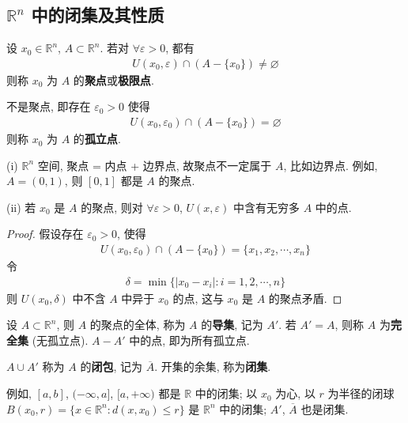 \documentclass[../../main.tex]{subfiles}
\begin{document}
\subsection{$\mathbb{R}^n$ 中的闭集及其性质}

\begin{definition}[聚点、极限点和孤立点]
设 $x_0 \in \mathbb{R}^n$, $A \subset \mathbb{R}^n$. 若对 $\forall \varepsilon > 0$, 都有
\begin{align*}
U(x_0, \varepsilon) \cap (A - \{x_0\}) \neq \varnothing
\end{align*}
则称 $x_0$ 为 $A$ 的\textbf{聚点}或\textbf{极限点}. 

不是聚点, 即存在 $\varepsilon_0 > 0$ 使得
\begin{align*}
U(x_0, \varepsilon_0) \cap (A - \{x_0\}) = \varnothing
\end{align*}
则称 $x_0$ 为 $A$ 的\textbf{孤立点}.
\end{definition}
\begin{remark}
(i) $\mathbb{R}^n$ 空间, 聚点 = 内点 + 边界点, 故聚点不一定属于 $A$, 比如边界点. 例如, $A = (0, 1)$, 则 $[0, 1]$ 都是 $A$ 的聚点.

(ii) 若 $x_0$ 是 $A$ 的聚点, 则对 $\forall \varepsilon > 0$, $U(x, \varepsilon)$ 中含有无穷多 $A$ 中的点.
\end{remark}
\begin{proof}
假设存在 $\varepsilon_0 > 0$, 使得
\begin{align*}
U(x_0, \varepsilon_0) \cap (A - \{x_0\}) = \{x_1, x_2, \cdots, x_n\}
\end{align*}
令
\begin{align*}
\delta = \min\{|x_0 - x_i| : i = 1, 2, \cdots, n\}
\end{align*}
则 $U(x_0, \delta)$ 中不含 $A$ 中异于 $x_0$ 的点, 这与 $x_0$ 是 $A$ 的聚点矛盾.
\end{proof}

\begin{definition}
设 $A \subset \mathbb{R}^n$, 则 $A$ 的聚点的全体, 称为 $A$ 的\textbf{导集}, 记为 $A'$. 若 $A' = A$, 则称 $A$ 为\textbf{完全集} (无孤立点).
$A - A'$ 中的点, 即为所有孤立点.

$A \cup A'$ 称为 $A$ 的\textbf{闭包}, 记为 $\overline{A}$.
开集的余集, 称为\textbf{闭集}.
\end{definition}
\begin{note}
例如, $[a, b]$, $(-\infty, a]$, $[a, +\infty)$ 都是 $\mathbb{R}$ 中的闭集; 以 $x_0$ 为心, 以 $r$ 为半径的闭球 $B(x_0, r) = \{x \in \mathbb{R}^n : d(x, x_0) \leqslant r\}$ 是 $\mathbb{R}^n$ 中的闭集; $A'$, $\overline{A}$ 也是闭集.
\end{note}
\end{document}
